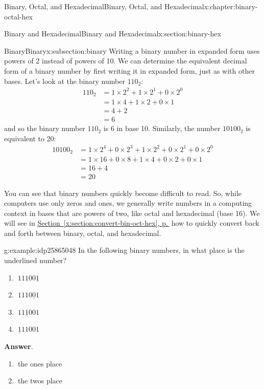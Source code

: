 \documentclass[twoside,10pt,]{book}
\newcommand{\blocktitlefont}{\relax}
\newcommand{\xreffont}{\relax}
\numberwithin{equation}{section}
\newcommand{\amp}{&}
\begin{document}
\begin{chapterptx}{Binary, Octal, and Hexadecimal}{}{Binary, Octal, and Hexadecimal}{}{}{x:chapter:binary-octal-hex}
\begin{sectionptx}{Binary and Hexadecimal}{}{Binary and Hexadecimal}{}{}{x:section:binary-hex}
\begin{subsectionptx}{Binary}{}{Binary}{}{}{x:subsection:binary}
Writing a binary number in expanded form uses powers of 2 instead of powers of 10.  We can determine the equivalent decimal form of a binary number by first writing it in expanded form, just as with other bases.  Let's look at the binary number \(110_2\):%
\begin{align*}
110_2 \amp =1\times 2^2+1\times2^1+0\times2^0\\
\amp = 1\times 4+1\times 2+0\times 1\\
\amp =4+2\\
\amp = 6
\end{align*}
and so the binary number \(110_2\) is 6 in base 10.  Similarly, the number \(10100_2\) is equivalent to 20:%
\begin{align*}
10100_2 \amp =1\times2^4+0\times2^3+1\times2^2+0\times2^1+0\times2^0\\
\amp = 1\times16+0\times 8+1\times 4+0\times 2+0\times 1\\
\amp = 16+4\\
\amp = 20
\end{align*}
%
\par
You can see that binary numbers quickly become difficult to read. So, while computers use only zeros and ones, we generally write numbers in a computing context in bases that are powers of two, like octal and hexadecimal (base 16).  We will see in \hyperref[x:section:convert-bin-oct-hex]{Section~{\xreffont\ref{x:section:convert-bin-oct-hex}}, p.\,\pageref{x:section:convert-bin-oct-hex}} how to quickly convert back and forth between binary, octal, and hexadecimal.%
\begin{example}{}{g:example:idp25865048}%
In the following binary numbers, in what place is the underlined number?%
\begin{enumerate}
\item{}\(\displaystyle \ 11100\underline{1}\)%
\item{}\(\displaystyle \ 1110\underline{0}1\)%
\item{}\(\displaystyle \ 11\underline{1}001\)%
\item{}\(\displaystyle \ \underline{1}11001\)%
\end{enumerate}
%
\par\smallskip%
\noindent\textbf{\blocktitlefont Answer}.\label{g:answer:idp25876056}{}\hypertarget{g:answer:idp25876056}{}\quad{}%
\begin{enumerate}
\item{}\(\ \)the ones place%
\item{}\(\ \)the twos place%

\end{enumerate}
\end{example}
\end{subsectionptx}
\end{sectionptx}
\end{chapterptx}
\end{document}
